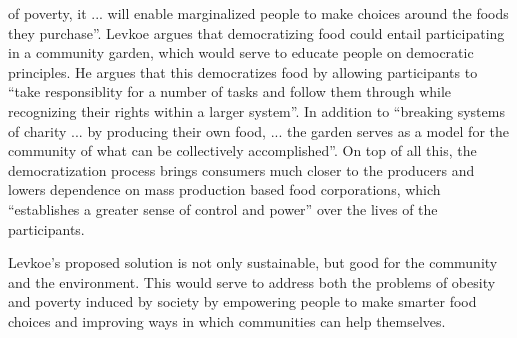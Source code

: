 \documentclass[letterpaper, 12pt]{article}
\begin{document}
of poverty, it ... will enable marginalized people to make choices around the
foods they purchase''. Levkoe argues that democratizing food could entail
participating in a community garden, which would serve to educate people
on democratic principles. He argues that this democratizes food by allowing
participants to ``take responsiblity for a number of tasks and follow them
through while recognizing their rights within a larger system''. In addition to
``breaking systems of charity ... by producing their own food, ... the garden
serves as a model for the community of what can be collectively accomplished''.
On top of all this, the democratization process brings consumers much closer
to the producers and lowers dependence on mass production based food
corporations, which ``establishes a greater sense of control and power''
over the lives of the participants. \par
Levkoe's proposed solution is not only sustainable, but good for the community
and the environment. This would serve to address both the problems of obesity
and poverty induced by society by empowering people to make smarter food choices
and improving ways in which communities can help themselves.
\end{document}
